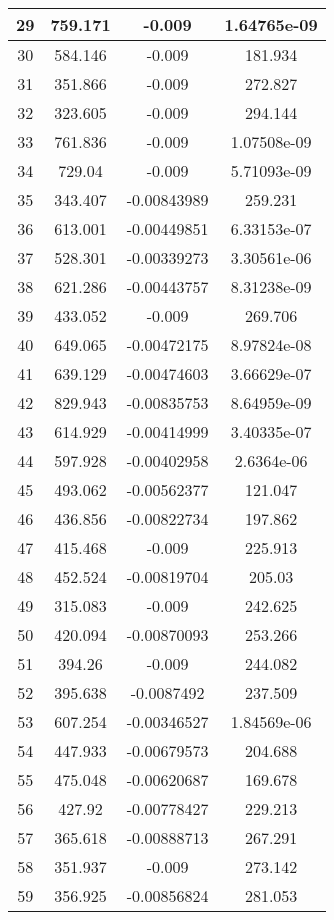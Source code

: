 \begin{table}[h]
{\begin{tabular}{|c|c|c|c|}
29	&	759.171	&	-0.009	&	1.64765e-09	\\	\hline
30	&	584.146	&	-0.009	&	181.934	\\	\hline
31	&	351.866	&	-0.009	&	272.827	\\	\hline
32	&	323.605	&	-0.009	&	294.144	\\	\hline
33	&	761.836	&	-0.009	&	1.07508e-09	\\	\hline
34	&	729.04	&	-0.009	&	5.71093e-09	\\	\hline
35	&	343.407	&	-0.00843989	&	259.231	\\	\hline
36	&	613.001	&	-0.00449851	&	6.33153e-07	\\	\hline
37	&	528.301	&	-0.00339273	&	3.30561e-06	\\	\hline
38	&	621.286	&	-0.00443757	&	8.31238e-09	\\	\hline
39	&	433.052	&	-0.009	&	269.706	\\	\hline
40	&	649.065	&	-0.00472175	&	8.97824e-08	\\	\hline
41	&	639.129	&	-0.00474603	&	3.66629e-07	\\	\hline
42	&	829.943	&	-0.00835753	&	8.64959e-09	\\	\hline
43	&	614.929	&	-0.00414999	&	3.40335e-07	\\	\hline
44	&	597.928	&	-0.00402958	&	2.6364e-06	\\	\hline
45	&	493.062	&	-0.00562377	&	121.047	\\	\hline
46	&	436.856	&	-0.00822734	&	197.862	\\	\hline
47	&	415.468	&	-0.009	&	225.913	\\	\hline
48	&	452.524	&	-0.00819704	&	205.03	\\	\hline
49	&	315.083	&	-0.009	&	242.625	\\	\hline
50	&	420.094	&	-0.00870093	&	253.266	\\	\hline
51	&	394.26	&	-0.009	&	244.082	\\	\hline
52	&	395.638	&	-0.0087492	&	237.509	\\	\hline
53	&	607.254	&	-0.00346527	&	1.84569e-06	\\	\hline
54	&	447.933	&	-0.00679573	&	204.688	\\	\hline
55	&	475.048	&	-0.00620687	&	169.678	\\	\hline
56	&	427.92	&	-0.00778427	&	229.213	\\	\hline
57	&	365.618	&	-0.00888713	&	267.291	\\	\hline
58	&	351.937	&	-0.009	&	273.142	\\	\hline
59	&	356.925	&	-0.00856824	&	281.053	\\	\hline

\end{tabular}}
\end{table}
